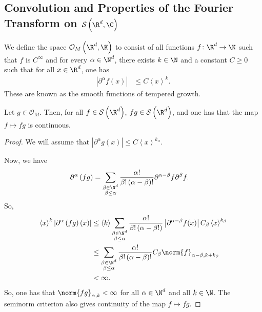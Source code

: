 \documentclass[10pt]{mypackage}
\begin{document}
\subsection{Convolution and Properties of the Fourier Transform on $\mathcal{S}\left( \R^d,\C \right)$}%
\begin{definition}
  We define the space $ \mathcal{O}_M\left( \R^d,\K \right) $ to consist of all functions $f\colon \R^d\to \K$ such that $f$ is $C^{\infty}$ and for every $\alpha\in \N^{d}$, there exists $k\in \N$ and a constant $C \geq 0$ such that for all $x\in \R^d$, one has
  \begin{align*}
    \left\vert \partial^{\alpha}f(x) \right\vert &\leq C \left\langle x \right\rangle^{k}.
  \end{align*}
  These are known as the smooth functions of tempered growth.
\end{definition}
\begin{proposition}
  Let $g\in \mathcal{O}_M$. Then, for all $f\in \mathcal{S}\left( \R^d \right)$, $fg\in \mathcal{S}\left( \R^d \right)$, and one has that the map $f\mapsto fg$ is continuous.
\end{proposition}
\begin{proof}
  We will assume that $\left\vert \partial^{\alpha}g(x) \right\vert\leq C \left\langle x \right\rangle^{k_{\alpha}}$.

  Now, we have
  \begin{align*}
    \partial^{\alpha}\left( fg \right) &= \sum_{\substack{\beta\in \N^d\\\beta\leq \alpha}} \frac{\alpha!}{\beta!\left( \alpha-\beta \right)!}\partial^{\alpha-\beta}f \partial^{\beta}f.
  \end{align*}
  So,
  \begin{align*}
\left\langle x \right\rangle^{k} \left\vert \partial^{\alpha}\left( fg \right)(x) \right\vert &\leq \left\langle k \right\rangle \sum_{\substack{\beta\in \N^d\\\beta\leq\alpha}} \frac{\alpha!}{\beta!\left( \alpha-\beta! \right)} \left\vert \partial^{\alpha-\beta}f(x) \right\vert C_{\beta} \left\langle x \right\rangle^{k_{\beta}}\\
                              &\leq \sum_{\substack{\beta\in \N^d\\\beta\leq\alpha}} \frac{\alpha!}{\beta!\left( \alpha-\beta \right)!} C_{\beta}\norm{f}_{\alpha-\beta,k + k_{\beta}}\\
                              &< \infty.
  \end{align*}
  So, one has that $\norm{fg}_{\alpha,k} < \infty$ for all $\alpha\in \N^d$ and all $k\in \N$. The seminorm criterion also gives continuity of the map $f\mapsto fg$.
\end{proof}
\end{document}
